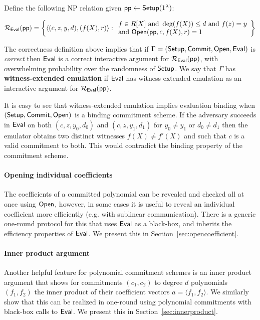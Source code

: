 \documentclass{article}
\theoremstyle{definition}
\begin{document}
Define the following NP relation given $\textsf{pp} \leftarrow \textsf{{Setup}}(1^\lambda)$: 

\[ 
\mathcal{R_\textsf{Eval}}(\textsf{pp}) = \left\{
\langle (c, z, y, d), (f(X), r) \rangle
: 
\begin{array}{l} 
f \in R[X] \ \text{and} \ \deg(f(X)) \leq d \ \text{and} \ f(z) = y \\ 
 \text{and} \ \textsf{{Open}}(\textsf{pp}, c, f(X), r) = 1 \\
\end{array}
\right\}
\] 

The correctness definition above implies that if $\Gamma = (\textsf{{Setup}}, \textsf{{Commit}}, \textsf{{Open}}, \textsf{{Eval}})$ is \emph{correct} then $\textsf{{Eval}}$ is a correct interactive argument for $\mathcal{R_\textsf{Eval}}(\textsf{pp})$, with overwhelming probability over the randomness of $\textsf{{Setup}}$. We say that $\Gamma$ has \textbf{witness-extended emulation} if $\textsf{{Eval}}$ has witness-extended emulation as an interactive argument for $\mathcal{R_\textsf{Eval}}(\textsf{pp})$. 

It is easy to see that witness-extended emulation implies evaluation binding when $(\textsf{{Setup}}, \textsf{{Commit}}, \textsf{{Open}})$ is a binding commitment scheme. If the adversary succeeds in $\textsf{{Eval}}$ on both $(c, z, y_0, d_0)$ and $(c, z, y_1, d_1)$ for $y_0 \neq y_1$ or $d_0 \neq d_1$ then the emulator obtains two distinct witnesses $f(X) \neq f'(X)$ and such that $c$ is a valid commitment to both. This would contradict the binding property of the commitment scheme. 

\paragraph{Opening individual coefficients} The coefficients of a committed polynomial can be revealed and checked all at once using $\textsf{{Open}}$, however, in some cases it is useful to reveal an individual coefficient more efficiently (e.g. with sublinear communication). 
There is a generic one-round protocol for this that uses $\textsf{{Eval}}$ as a black-box, and inherits the efficiency properties of $\textsf{{Eval}}$. We present this in Section~\ref{sec:opencoefficient}. 

\paragraph{Inner product argument} Another helpful feature for polynomial commitment schemes is an inner product argument that shows for commitments $(c_1, c_2)$ to degree $d$ polynomials $(f_1, f_2)$ the inner product of their coefficient vectors $a = \langle f_1, f_2 \rangle$. We similarly show that this can be realized in one-round using polynomial commitments with black-box calls to $\textsf{{Eval}}$. We present this in  Section~\ref{sec:innerproduct}. 
\end{document}

